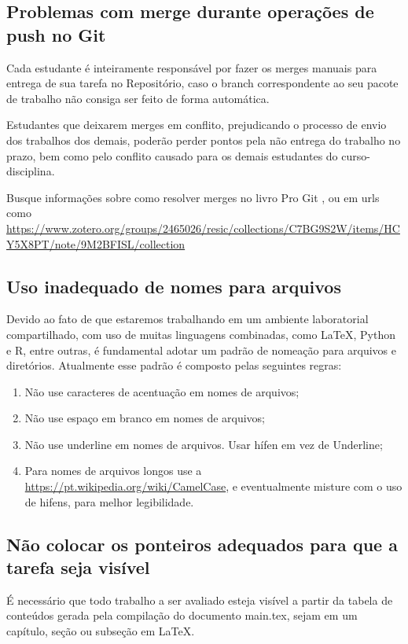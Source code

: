 \subsection{Problemas com merge durante operações de push no Git}

Cada estudante é inteiramente responsável por fazer os merges manuais para entrega de sua tarefa no Repositório, caso o branch correspondente ao seu pacote de trabalho não consiga ser feito de forma automática. 

Estudantes que deixarem merges em conflito, prejudicando o processo de envio dos trabalhos dos demais, poderão perder pontos pela não entrega do trabalho no prazo, bem como pelo conflito causado para os demais estudantes do curso-disciplina. 

Busque informações sobre como resolver merges no livro Pro Git \cite{chacon_pro_2014}, ou em  urls como \url{https://www.zotero.org/groups/2465026/resic/collections/C7BG9S2W/items/HCY5X8PT/note/9M2BFISL/collection}

\subsection{Uso inadequado de nomes para arquivos}

Devido ao fato de que estaremos trabalhando em um ambiente laboratorial compartilhado, com uso de muitas linguagens combinadas, como \LaTeX, Python e R, entre outras, é fundamental adotar um padrão de nomeação para arquivos e diretórios. Atualmente esse padrão é composto pelas seguintes regras:
\begin{enumerate}
    \item Não use caracteres de acentuação em nomes de arquivos;
    \item Não use espaço em branco em nomes de arquivos;
    \item Não use underline em nomes de arquivos. Usar hífen em vez de Underline;
    \item Para nomes de arquivos longos use a \url{https://pt.wikipedia.org/wiki/CamelCase}, e eventualmente misture com o uso de hifens, para melhor legibilidade.
\end{enumerate}

\subsection{Não colocar os ponteiros adequados para que a tarefa seja visível}

É necessário que todo trabalho a ser avaliado esteja visível a partir da tabela de conteúdos gerada pela compilação do documento main.tex, sejam em um capítulo, seção ou subseção em \LaTeX.


